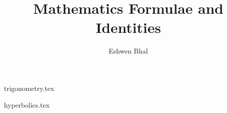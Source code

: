 \documentclass[a4paper,12pt,openright,oneside]{book}
\title{Mathematics Formulae and Identities}
\author{Eshwen Bhal}
\begin{document}
\frontmatter

\maketitle
\clearemptydoublepage

\tableofcontents
{}
\clearemptydoublepage

\mainmatter

{trigonometry.tex}
\clearemptydoublepage

{hyperbolics.tex}
\clearemptydoublepage

\backmatter
\end{document}
